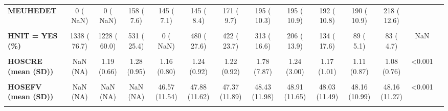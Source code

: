 \documentclass[
]{article}
\begin{document}
\begin{table}[H]
\begin{tabular}[t]{>{\raggedright\arraybackslash}p{5em}ccccccccccccc}
\textbf{MEUHEDET} & 0 (  NaN) & 0 (  NaN) & 158 (  7.6) & 145 (  7.1) & 145 (  8.4) & 171 (  9.7) & 195 ( 10.3) & 195 ( 10.9) & 192 ( 10.8) & 190 ( 10.9) & 218 ( 12.6) &  & \\
\textbf{\cellcolor{gray!10}{OTHER}} & \cellcolor{gray!10}{0 (  NaN)} & \cellcolor{gray!10}{0 (  NaN)} & \cellcolor{gray!10}{31 (  1.5)} & \cellcolor{gray!10}{11 (  0.5)} & \cellcolor{gray!10}{18 (  1.0)} & \cellcolor{gray!10}{11 (  0.6)} & \cellcolor{gray!10}{22 (  1.2)} & \cellcolor{gray!10}{28 (  1.6)} & \cellcolor{gray!10}{24 (  1.3)} & \cellcolor{gray!10}{13 (  0.7)} & \cellcolor{gray!10}{9 (  0.5)} & \cellcolor{gray!10}{} & \cellcolor{gray!10}{}\\
\textbf{HNIT = YES (\%)} & 1338 ( 76.7) & 1228 ( 60.0) & 531 ( 25.4) & 0 (  NaN) & 480 ( 27.6) & 422 ( 23.7) & 313 ( 16.6) & 206 ( 13.9) & 134 ( 17.6) & 89 (  5.1) & 83 (  4.7) & NaN & \\
\textbf{\cellcolor{gray!10}{HOSCHO (mean (SD))}} & \cellcolor{gray!10}{199.19 (43.57)} & \cellcolor{gray!10}{194.57 (47.82)} & \cellcolor{gray!10}{192.63 (43.52)} & \cellcolor{gray!10}{184.64 (44.35)} & \cellcolor{gray!10}{178.86 (46.09)} & \cellcolor{gray!10}{174.88 (44.30)} & \cellcolor{gray!10}{175.75 (46.50)} & \cellcolor{gray!10}{171.58 (46.66)} & \cellcolor{gray!10}{168.61 (44.97)} & \cellcolor{gray!10}{169.92 (47.47)} & \cellcolor{gray!10}{169.29 (49.33)} & \cellcolor{gray!10}{<0.001} & \cellcolor{gray!10}{}\\
\textbf{HOSCRE (mean (SD))} & NaN (NA) & 1.19 (0.66) & 1.28 (0.95) & 1.16 (0.80) & 1.24 (0.92) & 1.22 (0.92) & 1.78 (7.87) & 1.24 (3.00) & 1.17 (1.01) & 1.11 (0.87) & 1.08 (0.76) & <0.001 & \\
\textbf{\cellcolor{gray!10}{HOSEF = YES (\%)}} & \cellcolor{gray!10}{1219 ( 68.9)} & \cellcolor{gray!10}{1540 ( 75.2)} & \cellcolor{gray!10}{1801 ( 87.2)} & \cellcolor{gray!10}{1768 ( 85.6)} & \cellcolor{gray!10}{1389 ( 80.8)} & \cellcolor{gray!10}{1343 ( 76.2)} & \cellcolor{gray!10}{1331 ( 71.5)} & \cellcolor{gray!10}{1411 ( 80.0)} & \cellcolor{gray!10}{1512 ( 85.3)} & \cellcolor{gray!10}{1618 ( 93.4)} & \cellcolor{gray!10}{1551 ( 94.1)} & \cellcolor{gray!10}{<0.001} & \cellcolor{gray!10}{}\\
\textbf{HOSEFV (mean (SD))} & NaN (NA) & NaN (NA) & NaN (NA) & 46.57 (11.54) & 47.88 (11.62) & 47.37 (11.89) & 48.43 (11.98) & 48.91 (11.65) & 48.03 (11.49) & 48.16 (10.99) & 48.16 (11.27) & <0.001 & \\
\textbf{\cellcolor{gray!10}{HOSGLU (mean (SD))}} & \cellcolor{gray!10}{NaN (NA)} & \cellcolor{gray!10}{NaN (NA)} & \cellcolor{gray!10}{172.43 (90.64)} & \cellcolor{gray!10}{137.72 (65.64)} & \cellcolor{gray!10}{147.97 (73.97)} & \cellcolor{gray!10}{150.21 (77.54)} & \cellcolor{gray!10}{164.46 (96.26)} & \cellcolor{gray!10}{166.87 (87.04)} & \cellcolor{gray!10}{165.19 (84.41)} & \cellcolor{gray!10}{167.31 (86.71)} & \cellcolor{gray!10}{155.01 (76.24)} & \cellcolor{gray!10}{<0.001} & \cellcolor{gray!10}{}\\

\end{tabular}
\end{table}
\end{document}
